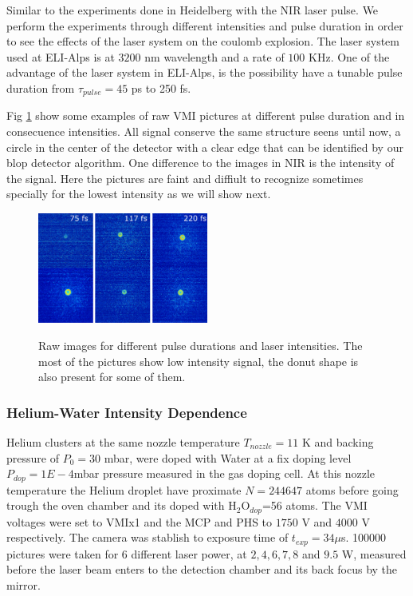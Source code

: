 Similar to the experiments done in Heidelberg with the NIR laser pulse. We perform the experiments through different intensities and pulse duration in order to see the effects of the laser system on the coulomb explosion. The laser system used at ELI-Alps is at $3200$ nm wavelength and a rate of $100$ KHz.  One of the advantage of the laser system in ELI-Alps, is the possibility have a tunable pulse duration from $\tau_{pulse}=45$ ps to 250 fs.

Fig \ref{fig;MIrlaserraw} show some examples of raw VMI pictures at different pulse duration and in consecuence intensities. All signal conserve the same structure seens until now, a circle in the center of the detector with a clear edge that can be identified by our blop detector algorithm. One difference to the images in NIR is the intensity of the signal. Here the pictures are faint and  diffiult to recognize sometimes specially for the lowest intensity as we will show next.

\begin{figure}[hbtp]
\caption[MIR He laser parameter examples ]{Raw images for different pulse durations and laser intensities. The most of the pictures show low intensity signal, the donut shape is also present for some of them.}
\centering
\includegraphics[width=0.5\textwidth]{../Images/results/MIR_He_pulsescan/raw/RAW_MIR_He_pulsescan.png}
\label{fig;MIrlaserraw}
\end{figure}

\subsubsection{Helium-Water Intensity Dependence}

Helium clusters at the same nozzle temperature $T_{nozzle}=11$ K and backing pressure of $P_{0}=30$ mbar, were doped with Water at a fix doping level $P_{dop}=1E-4$mbar pressure measured in the gas doping cell. At this nozzle temperature the Helium droplet have proximate $N=244647$ atoms before going trough the oven chamber and its doped with H$_{2}$O$_{dop}$=56 atoms. The VMI voltages were set to VMIx1 and the MCP and PHS to $1750$ V and $4000$ V respectively. The camera was stablish to exposure time of $t_{exp}=34 \mu$s. 100000 pictures were taken for 6 different laser power, at $2, 4, 6, 7, 8$ and $9.5$ W, measured before the laser beam enters to the detection chamber and its back focus by the mirror. 


